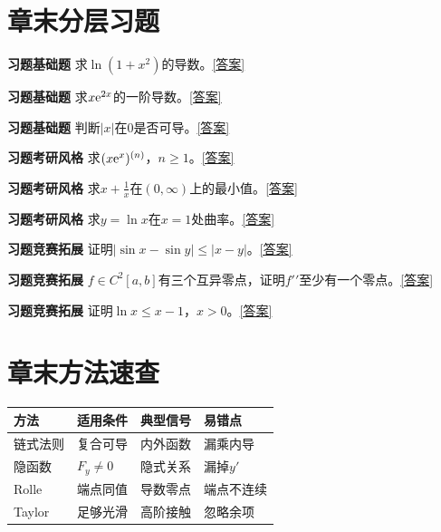 








\section*{章末分层习题}
\label{q:2:1}\par\noindent\textbf{习题\theexercise\quad 基础题} 求$\ln(1+x^2)$的导数。\quad\hyperref[a:2:1]{[答案]}\par
{}\label{q:2:2}\par\noindent\textbf{习题\theexercise\quad 基础题} 求$x\mathrm{e}^{2x}$的一阶导数。\quad\hyperref[a:2:2]{[答案]}\par
{}\label{q:2:3}\par\noindent\textbf{习题\theexercise\quad 基础题} 判断$|x|$在0是否可导。\quad\hyperref[a:2:3]{[答案]}\par
{}\label{q:2:4}\par\noindent\textbf{习题\theexercise\quad 考研风格} 求$(x\mathrm{e}^x)^{(n)}$，$n\ge1$。\quad\hyperref[a:2:4]{[答案]}\par
{}\label{q:2:5}\par\noindent\textbf{习题\theexercise\quad 考研风格} 求$x+\frac{1}{x}$在$(0,\infty)$上的最小值。\quad\hyperref[a:2:5]{[答案]}\par
{}\label{q:2:6}\par\noindent\textbf{习题\theexercise\quad 考研风格} 求$y=\ln x$在$x=1$处曲率。\quad\hyperref[a:2:6]{[答案]}\par
{}\label{q:2:7}\par\noindent\textbf{习题\theexercise\quad 竞赛拓展} 证明$|\sin x-\sin y|\le|x-y|$。\quad\hyperref[a:2:7]{[答案]}\par
{}\label{q:2:8}\par\noindent\textbf{习题\theexercise\quad 竞赛拓展} $f\in C^2[a,b]$有三个互异零点，证明$f\prime\prime$至少有一个零点。\quad\hyperref[a:2:8]{[答案]}\par
{}\label{q:2:9}\par\noindent\textbf{习题\theexercise\quad 竞赛拓展} 证明$\ln x\le x-1$，$x>0$。\quad\hyperref[a:2:9]{[答案]}\par
\section*{章末方法速查}
\par\noindent\begin{tabularx}{\textwidth}{p{23mm}XXX}\toprule 方法&适用条件&典型信号&易错点\\\midrule
链式法则&复合可导&内外函数&漏乘内导\\隐函数&$F_y\ne0$&隐式关系&漏掉$y\prime$\\Rolle&端点同值&导数零点&端点不连续\\Taylor&足够光滑&高阶接触&忽略余项\\
\bottomrule\end{tabularx}
